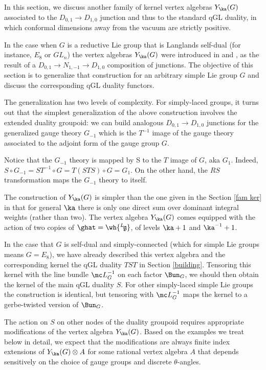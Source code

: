 \documentclass[11pt,reqno]{amsart}
\theoremstyle{plain}
\numberwithin{equation}{section}
\newcommand{\g}{\mathfrak{g}}
\def\neg{\negthinspace}
\def\lg{{}^L\neg\g}
\theoremstyle{definition}
\begin{document}
In this section, we discuss another family of kernel vertex algebras
$Y_\ka(G)$ associated to the $D_{0,1} \to D_{1,0}$ junction and thus to
the standard qGL duality, in which conformal dimensions away from the
vacuum are strictly positive.

In the case when $G$ is a reductive Lie group that is Langlands
self-dual (for instance, $E_8$ or $GL_n$) the vertex algebras
$Y_\ka(G)$ were introduced in \cite{Ga1} and \cite{CG}, as the result
of a $D_{0,1} \to N_{1,-1} \to D_{1,0}$ composition of junctions. The
objective of this section is to generalize that construction for an
arbitrary simple Lie group $G$ and discuss the corresponding qGL
duality functors.

The generalization has two levels of complexity. For simply-laced
groups, it turns out that the simplest generalization of the above
construction involves the extended duality groupoid: we can build
analogous $D_{0,1} \to D_{1,0}$ junctions for the generalized gauge
theory $G_{-1}$ which is the $T^{-1}$ image of the gauge theory
associated to the adjoint form of the gauge group $G$.

Notice that the $G_{-1}$ theory is mapped by S to the $T$ image of
$G$, aka $G_1$.  Indeed, $S \circ G_{-1} = ST^{-1} \circ G = T (S T S)
\circ G = G_{1}$. On the other hand, the $RS$ transformation maps the
$G_{-1}$ theory to itself.

The construction of $Y_\ka(G)$ is simpler than the one given in the
Section \ref{fam ker} in that for general $\ka$ there is only one
direct sum over dominant integral weights (rather than two). The
vertex algebra $Y_\ka(G)$ comes equipped with the action of two copies
of $\ghat = \wh{\lg}$, of levels $\ka+1$ and $\ka^{-1}+1$.

In the case that $G$ is self-dual and simply-connected (which for
simple Lie groups means $G=E_8$), we have already described this
vertex algebra and the corresponding kernel the qGL duality $TST$ in
Section \ref{building}. Tensoring this kernel with the line bundle
${\mc L}_G^{-1}$ on each factor $\Bun_G$, we should then obtain the
kernel of the main qGL duality $S$. For other simply-laced simple Lie
groups the construction is identical, but tensoring with ${\mc
  L}_G^{-1}$ maps the kernel to a gerbe-twisted version of $\Bun_G$.

The action on $S$ on other nodes of the duality groupoid requires
appropriate modifications of the vertex algebra $Y_\ka(G)$. Based on
the examples we treat below in detail, we expect that the
modifications are always finite index extensions of $Y_\ka(G) \otimes
A$ for some rational vertex algebra $A$ that depends sensitively on
the choice of gauge groups and discrete $\theta$-angles.
\end{document}
